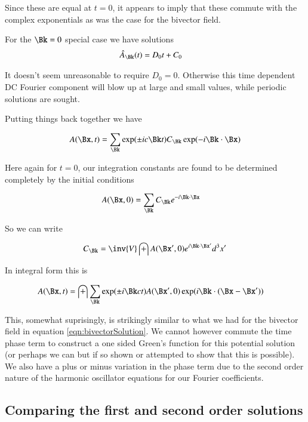 \documentclass{article}
\begin{document}
Since these are equal at $t=0$, it appears to imply that these commute with the
complex exponentials as was the case for the bivector field.

For the $\Bk = 0$ special case we have solutions
\begin{align*}
\hat{A}_{\Bk}(t) &= D_0 t + C_0
\end{align*}

It doesn't seem unreasonable to require $D_0 = 0$.  Otherwise this time dependent DC Fourier component will blow up at large and small values, while periodic
solutions are sought.

Putting things back together we have %

\begin{align*}
A(\Bx, t) &= \sum_{\Bk} \exp(\pm i c \Bk t) C_{\Bk} \exp( -i \Bk \cdot \Bx ) \\
\end{align*}

Here again for $t=0$, our integration constants are found to be determined completely by the initial conditions

\begin{align}
A(\Bx, 0) &= \sum_{\Bk} C_{\Bk} e^{ -i \Bk \cdot \Bx}
\end{align}

So we can write

\begin{align*}
C_{\Bk} = \inv{V} \int A(\Bx', 0) e^{ i \Bk \cdot \Bx'} d^3 x'
\end{align*}

In integral form this is

\begin{align}\label{eqn:potentialSolution}
A(\Bx, t) &= \int \sum_{\Bk} \exp(\pm i \Bk c t ) A(\Bx', 0) \exp( i \Bk \cdot (\Bx -\Bx') )
\end{align}

This, somewhat suprisingly, is strikingly similar to what we had for the bivector field in equation \ref{eqn:bivectorSolution}.  We cannot however
commute the time phase term to construct a one sided Green's function for this
potential solution (or perhaps we can but if so shown or attempted to show that this is possible).  We also have a 
plus or minus variation in the phase term due to the second order nature of the harmonic oscillator equations for our Fourier coefficients.

\subsection{ Comparing the first and second order solutions }
\end{document}
